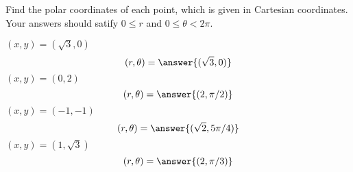 \begin{problem}
Find the polar coordinates of each point, which is given in Cartesian coordinates. Your answers should satify $0\leq r$ and $0\leq \theta < 2\pi$.

$(x,y) = (\sqrt{3},0)$
\[
(r,\theta) = \answer{(\sqrt{3},0)}
\]
$(x,y) = (0,2)$
\[
(r,\theta) = \answer{(2,\pi/2)}
\]
$(x,y) = (-1,-1)$
\[
(r,\theta) = \answer{(\sqrt{2},5\pi/4)}
\]
$(x,y) = (1,\sqrt{3})$
\[
(r,\theta) = \answer{(2,\pi/3)}
\]
\end{problem}